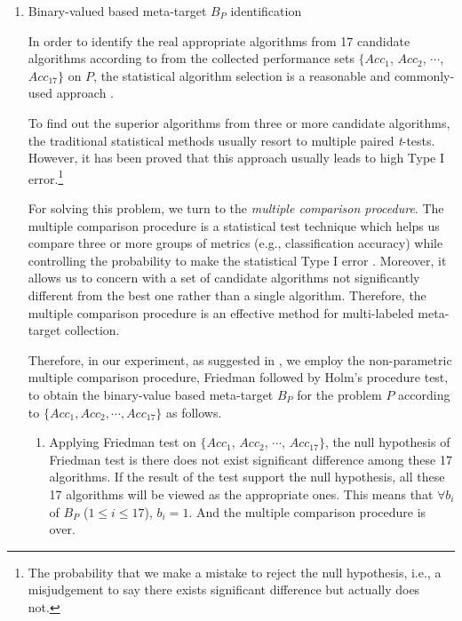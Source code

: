 \documentclass[acmsmall]{acmart}
\begin{document}
\begin{enumerate}
\begin{enumerate}
		\item{Binary-valued based meta-target $B_{P}$ identification}
		
		In order to identify the real appropriate algorithms from
		17 candidate algorithms according to from the
		collected performance sets $\{Acc_1$, $Acc_2$, $\cdots$, $Acc_{17}\}$ on $P$,
		the statistical algorithm selection is a reasonable and commonly-used approach
		\cite{pizarro2002multiple}.
		
		\quad To find out the superior algorithms from three or
		more candidate algorithms, the traditional statistical methods
		usually resort to multiple paired \emph{t}-tests. However, it has
		been proved that this approach usually leads to high Type I
		error.\footnote{The probability that we make a mistake to reject the
			null hypothesis, i.e., a misjudgement to say there exists
			significant difference but actually does not.}
		
		\quad For solving this problem, we turn to the \emph{multiple comparison
			procedure}. The multiple comparison procedure is a statistical test
		technique which helps us compare three or more groups of metrics
		(e.g., classification accuracy) while controlling the probability to make the statistical Type I
		error \cite{pizarro2002multiple}. Moreover, it allows us to concern with a
		set of candidate algorithms not significantly different from the best one
		rather than a single algorithm. Therefore, the multiple comparison procedure is
		an effective method for multi-labeled meta-target collection.
		
		\quad Therefore, in our experiment, as suggested in \cite{demvar2006statistical}, we employ
		the non-parametric multiple comparison procedure, Friedman followed by Holm's
		procedure test, to obtain the binary-value based meta-target $B_{P}$ for the problem
		$P$ according to $\{Acc_1, Acc_2, \cdots, Acc_{17}\}$ as follows.
		\begin{enumerate}
			\item Applying Friedman test on $\{Acc_1$, $Acc_2$, $\cdots$, $Acc_{17}\}$, the
			null hypothesis of Friedman test is there does not exist
			significant difference among these 17 algorithms. If the result
			of the test support the null hypothesis, all these 17 algorithms
			will be viewed as the appropriate ones. This means that $\forall
			b_i$ of $B_{P}$ ($1\leq i\leq 17$), $b_i = 1$. And the multiple
			comparison procedure is over.
			

\end{enumerate}
\end{enumerate}
\end{enumerate}
\end{document}
